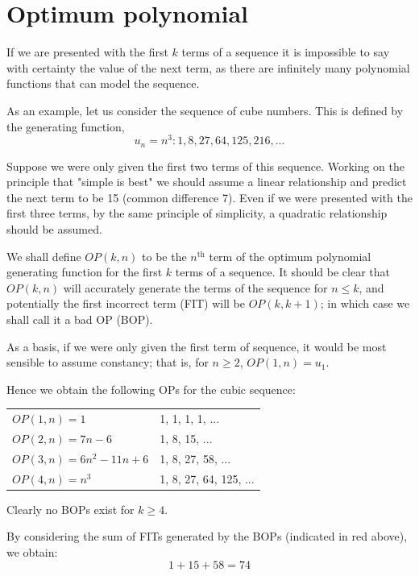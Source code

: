 \section{Optimum polynomial} \label{pb.0101}

If we are presented with the first $k$ terms of a sequence it is impossible to say with certainty the value of the next term, as there are infinitely many polynomial functions that can model the sequence.

As an example, let us consider the sequence of cube numbers. This is defined by the generating function,
$$u_n = n^3: 1, 8, 27, 64, 125, 216, ...$$

Suppose we were only given the first two terms of this sequence. Working on the principle that "simple is best" we should assume a linear relationship and predict the next term to be 15 (common difference 7). Even if we were presented with the first three terms, by the same principle of simplicity, a quadratic relationship should be assumed.

We shall define $OP(k, n)$ to be the $n^{\text{th}}$ term of the optimum polynomial generating function for the first $k$ terms of a sequence. It should be clear that $OP(k, n)$ will accurately generate the terms of the sequence for $n \leqslant k$, and potentially the first incorrect term (FIT) will be $OP(k, k+1)$; in which case we shall call it a bad OP (BOP).

As a basis, if we were only given the first term of sequence, it would be most sensible to assume constancy; that is, for $n \geqslant 2$, $OP(1, n) = u_1$.

Hence we obtain the following OPs for the cubic sequence:


\begin{center}
    \begin{tabular}{ll}
        $OP(1, n) = 1$ & 1, \textcolor[rgb]{1,0,0}{1}, 1, 1, ...\\
        $OP(2, n) = 7n-6$ & 1, 8, \textcolor[rgb]{1,0,0}{15}, ...\\
        $OP(3, n) = 6n^2-11n+6$ & 1, 8, 27, \textcolor[rgb]{1,0,0}{58}, ...\\
        $OP(4, n) = n^3$ & 1, 8, 27, 64, 125, ...\\
    \end{tabular}
\end{center}

Clearly no BOPs exist for $k \geqslant 4$.

By considering the sum of FITs generated by the BOPs (indicated in \textcolor[rgb]{1,0,0}{red} above), we obtain:
$$1 + 15 + 58 = 74$$


